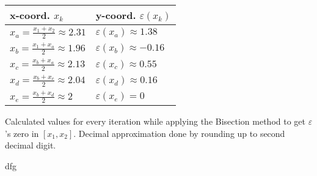 \begin{margintable}
    \begin{center}
        \footnotesize%
        \begin{tabular}{ll}
        \toprule
        x-coord. $x_k$ & y-coord. $\varepsilon(x_k)$\\
        \midrule
        $x_a = \frac{x_1 + x_2}{2} \approx 2.31$ & $\varepsilon(x_a) \approx 1.38 $\\
        $x_b = \frac{x_1 + x_a}{2} \approx 1.96$ & $\varepsilon(x_b) \approx -0.16 $\\
        $x_c = \frac{x_b + x_a}{2} \approx 2.13$ & $\varepsilon(x_c) \approx 0.55 $\\
        $x_d = \frac{x_b + x_c}{2} \approx 2.04$ & $\varepsilon(x_d) \approx 0.16 $\\
        $x_e = \frac{x_b + x_d}{2} \approx 2$ & $\varepsilon(x_e) = 0 $\\
        \bottomrule
        \end{tabular}
    \end{center}
    \caption{Calculated values for every iteration while applying the Bisection method to get
    $\varepsilon$'s zero in $[x_1, x_2]$. Decimal approximation done by rounding up to
    second decimal digit.}
    \label{tab:aaa}
\end{margintable}

dfg